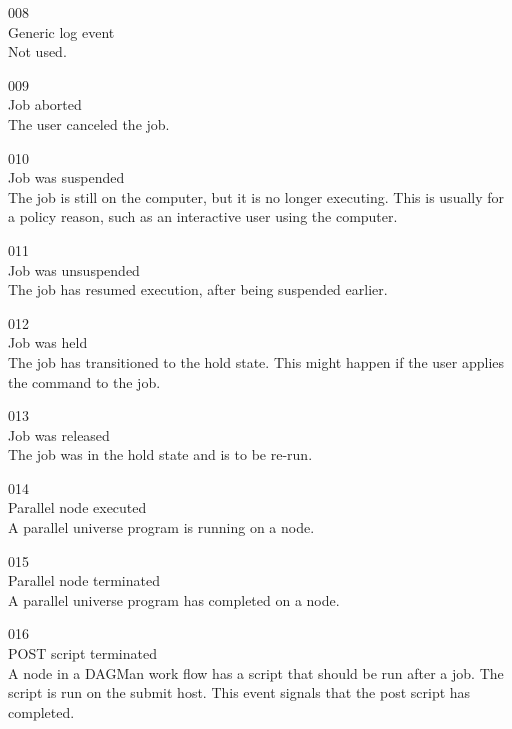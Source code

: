 \noindent{} 008 \\
 Generic log event \\
 Not used.

\noindent{} 009 \\
 Job aborted \\
 The user canceled the job.

\noindent{} 010 \\
 Job was suspended \\
 The job is still on the computer, but it is no longer
executing. 
This is usually for a policy reason, such as an interactive user using
the computer. 

\noindent{} 011 \\
 Job was unsuspended \\
 The job has resumed execution, after being
suspended earlier. 

\noindent{} 012 \\
 Job was held \\
 The job has transitioned to the hold state.
This might happen if the user applies the  command to the job.

\noindent{} 013 \\
 Job was released \\
 The job was in the hold state and is to be re-run.

\noindent{} 014 \\
 Parallel node executed \\
 A parallel universe program is running on a node.

\noindent{} 015 \\
 Parallel node terminated \\
 A parallel universe program has completed on a node.

\noindent{} 016 \\
 POST script terminated \\
 A node in a DAGMan work flow has a script
that should be run after a job. 
The script is run on the submit host. 
This event signals that the post script has completed.

